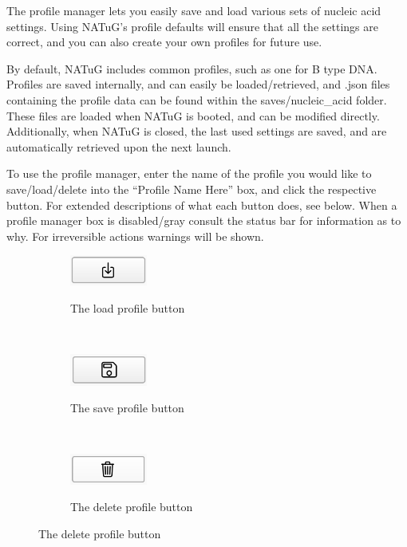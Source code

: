 \documentclass[titlepage]{article}
\begin{document}
	The profile manager lets you easily save and load various sets of nucleic acid settings. Using NATuG’s profile defaults will ensure that all the settings are correct, and you can also create your own profiles for future use.
	
	By default, NATuG includes common profiles, such as one for B type DNA. Profiles are saved internally, and can easily be loaded/retrieved, and .json files containing the profile data can be found within the saves/nucleic\_acid folder. These files are loaded when NATuG is booted, and can be modified directly. Additionally, when NATuG is closed, the last used settings are saved, and are automatically retrieved upon the next launch.
	
	To use the profile manager, enter the name of the profile you would like to save/load/delete into the “Profile Name Here” box, and click the respective button. For extended descriptions of what each button does, see below. When a profile manager box is disabled/gray consult the status bar for information as to why. For irreversible actions warnings will be shown.
	
	\begin{figure}
		\caption{Various Profile Actions}
		
		\centering
		\begin{subfigure}{.3\textwidth}
			\centering
			\caption{The load profile button}
			\includegraphics[width=1in]{load-profile-button.png}
			\label{fig:load-profile-button}
		\end{subfigure}%
		~
		\begin{subfigure}{.3\textwidth}
			\centering
			\caption{The save profile button}
			\includegraphics[width=1in]{save-profile-button.png}
			\label{fig:save-profile-button}
		\end{subfigure}%
		~
		\begin{subfigure}{.3\textwidth}
			\centering
			\caption{The delete profile button}
			\includegraphics[width=1in]{delete-profile-button.png}
			\label{fig:delete-profile-button}
		\end{subfigure}
	\end{figure}
	
\end{document}
